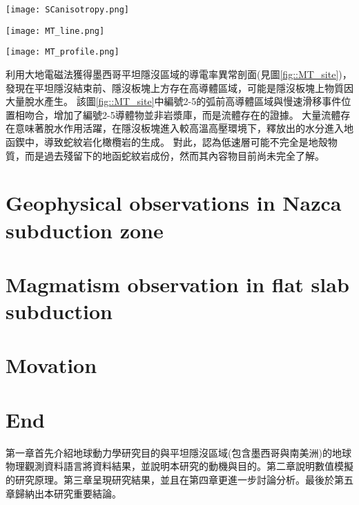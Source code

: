 \begin{figure*}[ht!]
    \centering
    \texttt{[image: SCanisotropy.png]}
    \caption{墨西哥隱沒帶板塊介面附近剪切帶結構示意圖(\citealp{Song2012SC}
    )。大地震主要發生在鎖定區(locked zone)和脆性(brittle)變形區域。慢速滑移事件(slow-slip event)主要發生在過渡帶(transition zone)和半韌性區域(seni-ductile regime)，Vs非常低，且非均向性極強。岩石流變轉換由350$^{\circ}$等溫線(淺藍色線)分開，導致應力梯度形成且方向與黏土礦物中流體壓力相反，導致低速帶的形成。這些低速帶流體導致板塊介面處於低耦合狀態，並且主導該地區慢速滑移事件的生成。
    }
    \label{fig::SCanisotorpy2012}
\end{figure*}

\begin{figure*}[ht!]
    \centering
    \texttt{[image: MT\_line.png]}
    \caption{\citealp{MT2006}中所使用的大地電磁剖面位置圖，本研究僅使用BB'剖面。
    }
    \label{fig::MT_site}
\end{figure*}

\begin{figure*}[ht!]
    \centering
    \texttt{[image: MT\_profile.png]}
    \caption{墨西哥平坦隱沒區域的導電率異常剖面圖與解釋圖，摘自\citealp{MT2006}。上圖為電阻率異常結果剖面，所繪之隱沒板塊位置參考自\citealp{pardo1995}結果，最上方標示跨墨西哥火山帶的範圍。圖中每個數字圈皆代表隱沒帶上岩石發生向變後脫水的位置。下圖為電阻異常解釋圖，綠色區域為電阻異常低區(<100 $\Omega m$)。在平坦隱沒段結束處有多個岩石相變事件發生，隱沒板塊上出現大範圍導體。
    }
    \label{fig::MT_profile}
\end{figure*}

\citealp{MT2006}利用大地電磁法獲得墨西哥平坦隱沒區域的導電率異常剖面(見圖\ref{fig::MT_site})，發現在平坦隱沒結束前、隱沒板塊上方存在高導體區域，可能是隱沒板塊上物質因大量脫水產生。
該圖\ref{fig::MT_site}中編號2-5的弧前高導體區域與慢速滑移事件位置相吻合，增加了編號2-5導體物並非岩漿庫，而是流體存在的證據。
大量流體存在意味著脫水作用活躍，在隱沒板塊進入較高溫高壓環境下，釋放出的水分進入地函鍥中，導致蛇紋岩化橄欖岩的生成。
對此，\citealp{Manea2013}認為低速層可能不完全是地殼物質，而是過去殘留下的地函蛇紋岩成份，然而其內容物目前尚未完全了解。

\section{Geophysical observations in Nazca subduction zone}

\section{Magmatism observation in flat slab subduction}

\section{Movation}

\section{End}
第一章首先介紹地球動力學研究目的與平坦隱沒區域(包含墨西哥與南美洲)的地球物理觀測資料語言將資料結果，並說明本研究的動機與目的。第二章說明數值模擬的研究原理。第三章呈現研究結果，並且在第四章更進一步討論分析。最後於第五章歸納出本研究重要結論。